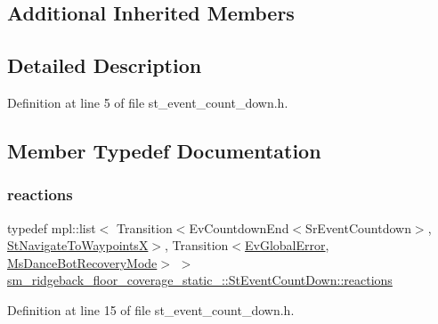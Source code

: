 \subsection*{Additional Inherited Members}


\subsection{Detailed Description}


Definition at line 5 of file st\+\_\+event\+\_\+count\+\_\+down.\+h.



\subsection{Member Typedef Documentation}
\mbox{\label{structsm__ridgeback__floor__coverage__static__1_1_1StEventCountDown_a8a50d333167a3f6846dde61cda0d0b43}} 
\subsubsection{\texorpdfstring{reactions}{reactions}}
{\footnotesize\ttfamily typedef mpl\+::list$<$ Transition$<$Ev\+Countdown\+End$<$Sr\+Event\+Countdown$>$, \hyperlink{structsm__ridgeback__floor__coverage__static__1_1_1StNavigateToWaypointsX}{St\+Navigate\+To\+WaypointsX}$>$, Transition$<$\hyperlink{structsm__ridgeback__floor__coverage__static__1_1_1EvGlobalError}{Ev\+Global\+Error}, \hyperlink{classsm__ridgeback__floor__coverage__static__1_1_1MsDanceBotRecoveryMode}{Ms\+Dance\+Bot\+Recovery\+Mode}$>$ $>$ \hyperlink{structsm__ridgeback__floor__coverage__static__1_1_1StEventCountDown_a8a50d333167a3f6846dde61cda0d0b43}{sm\+\_\+ridgeback\+\_\+floor\+\_\+coverage\+\_\+static\+\_\+::\+St\+Event\+Count\+Down\+::reactions}}



Definition at line 15 of file st\+\_\+event\+\_\+count\+\_\+down.\+h.



